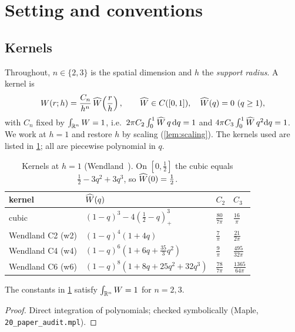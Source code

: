 \section{Setting and conventions}\label{sec:setting}

\subsection{Kernels}
Throughout, $n\in\{2,3\}$ is the spatial dimension and $h$ the \emph{support radius}. A kernel is
\begin{equation}\label{eq:kernel}
  W(r;h)=\frac{C_n}{h^n}\,\widehat W\!\left(\frac rh\right),\qquad \widehat W\in C([0,1]),\quad \widehat W(q)=0\ (q\ge1),
\end{equation}
with $C_n$ fixed by $\int_{\mathbb{R}^n}W=1$, i.e.\ $2\pi C_2\int_0^1\widehat W\,q\,\mathrm{d} q=1$ and
$4\pi C_3\int_0^1\widehat W\,q^2\mathrm{d} q=1$. We work at $h=1$ and restore $h$ by scaling (\cref{lem:scaling}).
The kernels used are listed in \cref{tab:kernels}; all are piecewise polynomial in $q$.
\begin{table}[h]
\centering
\begin{tabular}{llll}
\toprule
kernel & $\widehat W(q)$ & $C_2$ & $C_3$\\
\midrule
cubic & $(1-q)^3-4(\tfrac12-q)_+^3$ & $\frac{80}{7\pi}$ & $\frac{16}{\pi}$\\[2pt]
Wendland C2 (w2) & $(1-q)^4(1+4q)$ & $\frac7\pi$ & $\frac{21}{2\pi}$\\[2pt]
Wendland C4 (w4) & $(1-q)^6(1+6q+\frac{35}{3}q^2)$ & $\frac9\pi$ & $\frac{495}{32\pi}$\\[2pt]
Wendland C6 (w6) & $(1-q)^8(1+8q+25q^2+32q^3)$ & $\frac{78}{7\pi}$ & $\frac{1365}{64\pi}$\\
\bottomrule
\end{tabular}
\caption{Kernels at $h=1$ (Wendland~\cite{wendland1995}). On $[0,\frac12]$ the cubic equals
$\frac12-3q^2+3q^3$, so $\widehat W(0)=\frac12$.}\label{tab:kernels}
\end{table}

\begin{lemma}[Normalisation]\label{lem:norm}
The constants in \cref{tab:kernels} satisfy $\int_{\mathbb{R}^n}W=1$ for $n=2,3$.
\end{lemma}
\begin{proof}
Direct integration of polynomials; checked symbolically (Maple, \texttt{20\_paper\_audit.mpl}).
\end{proof}

